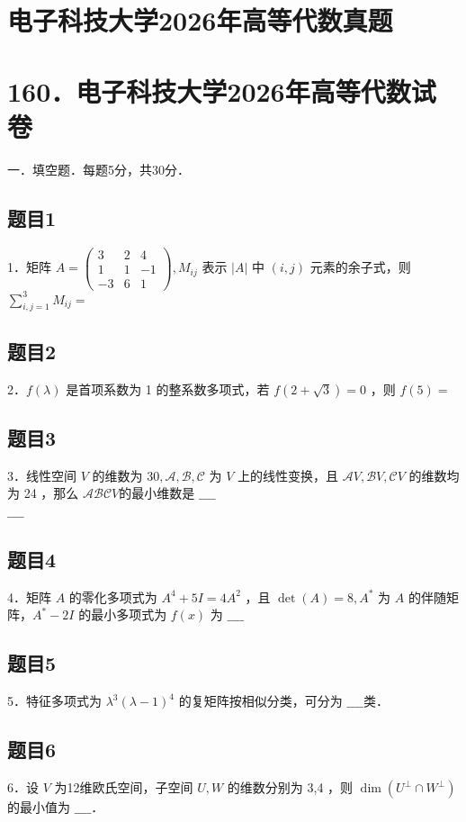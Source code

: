 \documentclass{article}
\begin{document}
\section*{电子科技大学2026年高等代数真题}
\section*{160．电子科技大学2026年高等代数试卷}
一．填空题．每题5分，共30分．\\

\subsection{题目1}
1．矩阵 \(A=\left(\begin{array}{ccc}3 & 2 & 4 \\ 1 & 1 & -1 \\ -3 & 6 & 1\end{array}\right), M_{i j}\) 表示 \(|A|\) 中 \((i, j)\) 元素的余子式，则 \(\sum_{i, j=1}^{3} M_{i j}=\)

\subsection{题目2}
2．\(f(\lambda)\) 是首项系数为 1 的整系数多项式，若 \(f(2+\sqrt{3})=0\) ，则 \(f(5)=\)

\subsection{题目3}
3．线性空间 \(V\) 的维数为 \(30, \mathcal{A}, \mathcal{B}, \mathcal{C}\) 为 \(V\) 上的线性变换，且 \(\mathcal{A} V, \mathcal{B} V, \mathcal{C} V\) 的维数均为 24 ，那么 \(\mathcal{A} \mathcal{B} \mathcal{C} V\)的最小维数是 \(\_\_\_\_\)\\
\(\_\_\_\_\)

\subsection{题目4}
4．矩阵 \(A\) 的零化多项式为 \(A^{4}+5 I=4 A^{2}\) ，且 \(\operatorname{det}(A)=8, A^{*}\) 为 \(A\) 的伴随矩阵，\(A^{*}-2 I\) 的最小多项式为 \(f(x)\) 为 \(\_\_\_\_\)

\subsection{题目5}
5．特征多项式为 \(\lambda^{3}(\lambda-1)^{4}\) 的复矩阵按相似分类，可分为 \(\_\_\_\_\)类．

\subsection{题目6}
6．设 \(V\) 为12维欧氏空间，子空间 \(U, W\) 的维数分别为 3,4 ，则 \(\operatorname{dim}\left(U^{\perp} \cap W^{\perp}\right)\) 的最小值为 \(\_\_\_\_\)．
\end{document}
